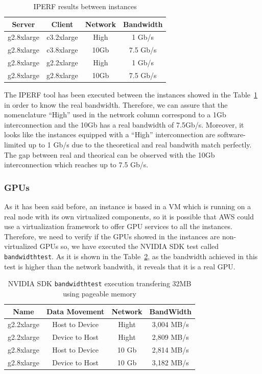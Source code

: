 \documentclass[a4paper,twoside]{article}
\begin{document}
\begin{table}[htb]
\renewcommand{\arraystretch}{1.3}
\caption{IPERF results between instances}
\label{table:iperf}
\tabcolsep=0.24cm
\begin{center}\begin{tabular}{cccc}
Server & Client & Network & Bandwidth\\ \hline \hline
g2.8xlarge & c3.2xlarge & High & 1  Gb/s\\ \hline
g2.8xlarge & c3.8xlarge & 10Gb & 7.5  Gb/s\\ \hline
g2.8xlarge & g2.2xlarge & High & 1 Gb/s\\ \hline
g2.8xlarge & g2.8xlarge & 10Gb & 7.5  Gb/s\\ \hline
\end{tabular}\end{center}\end{table}

The IPERF tool has been executed between the instances showed in 
the Table~\ref{table:iperf} in order to know the real bandwidth.
Therefore, we can assure that the nomenclature ``High'' used in the 
network column correspond to a 1Gb interconnection and the 10Gb has 
a real bandwidth of 7.5Gb/s.
Moreover, it looks like the instances equipped with a ``High'' interconnection 
are software-limited up to 1 Gb/s due to the theoretical and real bandwith 
match perfectly. The gap between real and theorical can be observed with 
the 10Gb interconnection which reaches up to 7.5 Gb/s.


\subsubsection{GPUs}
As it has been said before, an instance is based in a VM 
which is running on a real node with its own virtualized 
components, so it is possible that AWS could use a virtualization 
framework to offer GPU services to all the instances.
Therefore, we need to verify if the GPUs showed in the instances are 
non-virtualized GPUs so, we have executed the NVIDIA SDK test called 
{\tt bandwidthtest}. As it is shown in the Table~\ref{table:bwt}, as the bandwidth achieved 
in this test is higher than the network bandwith, it reveals that it is a 
real GPU. 
\begin{table}[htb]
\renewcommand{\arraystretch}{1.3}
\caption{NVIDIA SDK {\tt bandwidthtest} execution transfering 32MB using pageable memory }
\label{table:bwt}
\tabcolsep=0.09cm
\begin{center}\begin{tabular}{cccc}
Name &  Data Movement & Network & BandWidth \\ \hline \hline
g2.2xlarge & Host to Device & Hight& 3,004 MB/s \\ \hline
g2.2xlarge & Device to Host & Hight& 2,809 MB/s\\ \hline
g2.8xlarge & Host to Device & 10 Gb& 2,814 MB/s\\ \hline
g2.8xlarge & Device to Host & 10 Gb& 3,182 MB/s\\ \hline
\end{tabular}\end{center}\end{table}
\end{document}
